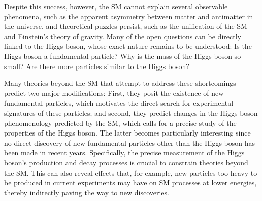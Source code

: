 Despite this success, however, the SM cannot explain several observable phenomena, such as the apparent asymmetry between matter and antimatter in the universe, and theoretical puzzles persist, such as the unification of the SM and Einstein's theory of gravity.
Many of the open questions can be directly linked to the Higgs boson, whose exact nature remains to be understood: Is the Higgs boson a fundamental particle? Why is the mass of the Higgs boson so small? Are there more particles similar to the Higgs boson?

Many theories beyond the SM that attempt to address these shortcomings predict two major modifications: First, they posit the existence of new fundamental particles, which motivates the direct search for experimental signatures of these particles; and second, they predict changes in the Higgs boson phenomenology predicted by the SM, which calls for a precise study of the properties of the Higgs boson. 
The latter becomes particularly interesting since no direct discovery of new fundamental particles other than the Higgs boson has been made in recent years. 
Specifically, the precise measurement of the Higgs boson's production and decay processes is crucial to constrain theories beyond the SM. 
This can also reveal effects that, for example, new particles too heavy to be produced in current experiments may have on SM processes at lower energies, thereby indirectly paving the way to new discoveries. 
